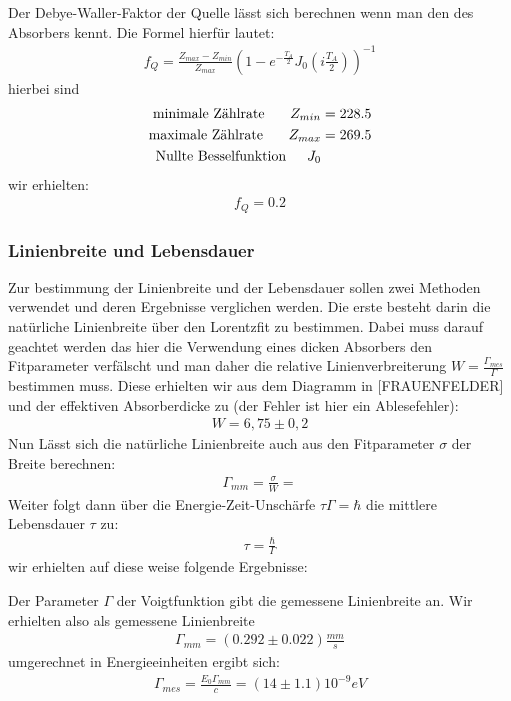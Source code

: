 \documentclass[12pt]{article}
\begin{document}
Der Debye-Waller-Faktor der Quelle lässt sich berechnen wenn man den des Absorbers kennt. Die Formel hierfür lautet:
\begin{align*}
f_Q=\frac{Z_{max} - Z_{min}}{Z_{max}} \left( 1 - e^{-\frac{T_A}{2}} J_0 \left( i \frac{T_A}{2} \right) \right)^{-1}
\end{align*}
hierbei sind 
\begin{align*}
  \textnormal{minimale Zählrate } \hspace{15pt} Z_{min} &= 228.5 \\
  \textnormal{maximale Zählrate } \hspace{15pt} Z_{max} &= 269.5 \\
  \textnormal{Nullte Besselfunktion} \hspace{15pt} J_0
\end{align*}
wir erhielten:
\begin{align*}
f_Q = 0.2
\end{align*}


\subsubsection{Linienbreite und Lebensdauer}
Zur bestimmung der Linienbreite und der Lebensdauer sollen zwei Methoden verwendet und deren Ergebnisse verglichen werden. Die erste besteht darin
die natürliche Linienbreite über den Lorentzfit zu bestimmen. Dabei muss darauf geachtet werden das hier die Verwendung eines dicken Absorbers den
Fitparameter verfälscht und man daher die relative Linienverbreiterung $W = \frac{\Gamma_{mes}}{\Gamma}$ bestimmen muss. Diese erhielten wir aus dem 
Diagramm in [FRAUENFELDER] und der effektiven Absorberdicke zu (der Fehler ist hier ein Ablesefehler):
\begin{align*}
 W = 6,75 \pm 0,2
\end{align*}
Nun Lässt sich die  natürliche Linienbreite auch aus den Fitparameter $\sigma$ der Breite berechnen:
\begin{align*}
 \Gamma_{mm} = \frac{\sigma}{W} = 
\end{align*}
Weiter folgt dann über  die Energie-Zeit-Unschärfe 
$\tau \Gamma = \hbar$ die mittlere Lebensdauer $\tau$ zu:
\begin{align*}
 \tau = \frac{\hbar}{\Gamma}
\end{align*}
wir erhielten auf diese weise folgende Ergebnisse:



Der Parameter $\Gamma$ der Voigtfunktion gibt die gemessene Linienbreite an. Wir erhielten also als gemessene Linienbreite
\begin{align*}
 \Gamma_{mm} = (0.292 \pm 0.022) \frac{mm}{s}
\end{align*}
umgerechnet in Energieeinheiten ergibt sich:
\begin{align*}
 \Gamma_{mes} = \frac{E_0\Gamma_{mm}}{c} = (14 \pm 1.1) 10^{-9}eV
\end{align*}
\end{document}

